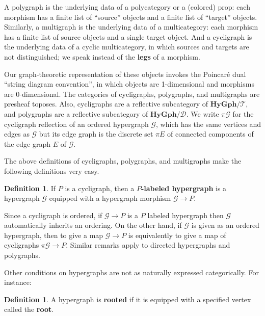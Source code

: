 \documentclass{article}
\theoremstyle{definition}
\newtheorem{defn}[thm]{Definition}
\theoremstyle{remark}
\def\G{\mathcal{G}}
\def\hy{\mathbf{HyGph}}
\def\thy{\mathcal{T}}
\def\dhy{\mathcal{D}}
\begin{document}
A polygraph is the underlying data of a polycategory or a (colored) prop: each morphism has a finite list of ``source'' objects and a finite list of ``target'' objects.
Similarly, a multigraph is the underlying data of a multicategory: each morphism has a finite list of source objects and a single target object.
And a cycligraph is the underlying data of a cyclic multicategory, in which sources and targets are not distinguished; we speak instead of the \textbf{legs} of a morphism.

Our graph-theoretic representation of these objects invokes the Poincar\'e dual ``string diagram convention'', in which objects are 1-dimensional and morphisms are 0-dimensional.
The categories of cycligraphs, polygraphs, and multigraphs are presheaf toposes.
Also, cycligraphs are a reflective subcategory of $\hy/\thy$, and polygraphs are a reflective subcategory of $\hy/\dhy$.
We write $\pi \G$ for the cycligraph reflection of an ordered hypergraph $\G$, which has the same vertices and edges as $\G$ but its edge graph is the discrete set $\pi E$ of connected components of the edge graph $E$ of $\G$.

The above definitions of cycligraphs, polygraphs, and multigraphs make the following definitions very easy.

\begin{defn}\label{thm:labeled}
  If $P$ is a cycligraph, then a \textbf{$P$-labeled hypergraph} is a hypergraph $\G$ equipped with a hypergraph morphism $\G\to P$.
\end{defn}

Since a cycligraph is ordered, if $\G\to P$ is a $P$ labeled hypergraph then $\G$ automatically inherits an ordering.
On the other hand, if $\G$ is given as an ordered hypergraph, then to give a map $\G\to P$ is equivalently to give a map of cycligraphs $\pi \G \to P$.
Similar remarks apply to directed hypergraphs and polygraphs.

Other conditions on hypergraphs are not as naturally expressed categorically.
For instance:

\begin{defn}
  A hypergraph is \textbf{rooted} if it is equipped with a specified vertex called the \textbf{root}.
\end{defn}
\end{document}
